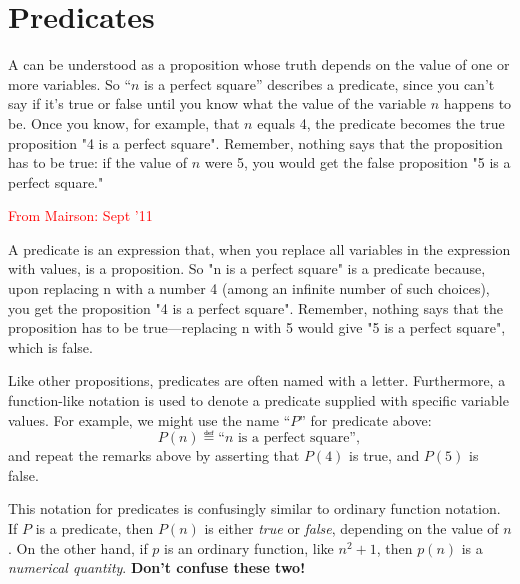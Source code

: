 \section{Predicates}

A  can be understood as a proposition whose truth
depends on the value of one or more variables.  So ``$n$ is a perfect
square'' describes a predicate, since you can't say if it's true or
false until you know what the value of the variable $n$ happens to be.
Once you know, for example, that $n$ equals 4, the predicate becomes
the true proposition "4 is a perfect square".  Remember, nothing says
that the proposition has to be true: if the value of $n$ were 5, you
would get the false proposition "5 is a perfect square."


\begin{editingnotes}
\textcolor{red}{From Mairson: Sept '11}

A predicate is an expression that, when you replace all variables in
the expression with values, is a proposition.  So "n is a perfect
square" is a predicate because, upon replacing n with a number 4
(among an infinite number of such choices), you get the proposition "4
is a perfect square".  Remember, nothing says that the proposition has
to be true---replacing n with 5 would give "5 is a perfect square",
which is false.
\end{editingnotes}

\iffalse
Most of the propositions above were defined in terms of predicates.
For example,
%
\begin{center}
``$n$ is a perfect square''
\end{center}
%
is a predicate whose truth depends on the value of $n$.  The predicate is
true for $n = 4$ since four is a perfect square, but false for $n = 5$
since five is not a perfect square.  
\fi

Like other propositions, predicates are often named with a letter.
Furthermore, a function-like notation is used to denote a predicate
supplied with specific variable values.  For example, we might use the
name ``$P$'' for predicate above:
\[
P(n) \eqdef \text{``$n$ is a perfect square''},
\]
and repeat the remarks above by asserting that $P(4)$ is true, and
$P(5)$ is false.

This notation for predicates is confusingly similar to ordinary function
notation.  If $P$ is a predicate, then $P(n)$ is either \textit{true} or
\textit{false}, depending on the value of $n$.  On the other hand, if $p$
is an ordinary function, like $n^2 + 1$, then $p(n)$ is a
\textit{numerical quantity}.  \textbf{Don't confuse these two!}


